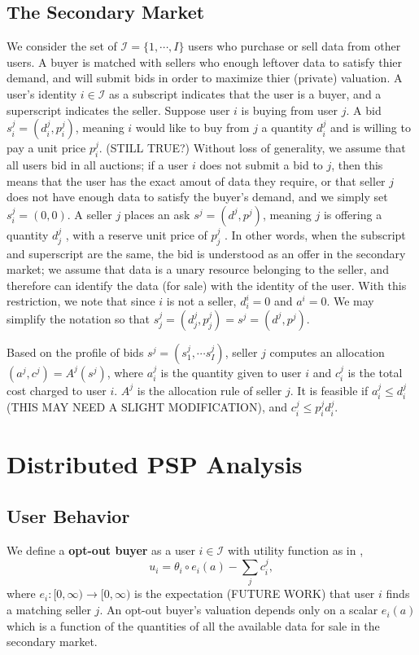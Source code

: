 \documentclass[12pt]{article}
\theoremstyle{definition}
\newcommand{\mcI}{\mathcal{I}}
\begin{document}
\begin{multicols}{2}
\subsection{The Secondary Market}

We consider the set of $\mcI = \lbrace 1, \cdots, I\rbrace$ users who purchase or sell
data from other users. A buyer is matched with sellers who enough leftover data
to satisfy thier demand, and will submit bids in order to maximize thier (private) valuation.
A user's identity $i \in \mcI$ as a subscript indicates that the user
is a buyer, and a superscript indicates the seller.
Suppose user $i$ is buying from user $j$. A bid $s_i^j = (d_i^j, p_i^j)$,
meaning $i$ would like to buy from $j$ a quantity $d^j_i$ and is willing to pay
a unit price $p^j_i$. (STILL TRUE?) Without loss of generality, we assume that all users bid in all
auctions; if a user $i$ does not submit a bid to $j$, then this means that
the user has the exact amout of data they require, or that seller $j$ does not have
enough data to satisfy the buyer's demand, and we simply set $s^j_i = (0, 0)$.
A seller $j$ places an ask $s^j = (d^j, p^j)$, meaning $j$ is offering a
quantity $d_j^j$ , with a reserve unit price of $p_j^j$ . In other words, when the subscript and
superscript are the same, the bid is understood as an offer in the secondary
market; we assume that data is a unary resource belonging to the seller, and
therefore can identify the data (for sale) with the identity of the user.
With this restriction, we note that since $i$ is not a seller, $d_i^i = 0$ and
$a^i = 0$. We may simplify the notation so that $s_j^j = (d_j^j, p_j^j) = s^j = (d^j, p^j)$.

Based on the profile of bids $s^j = (s^j_1, \cdots s^j_I)$, seller $j$ computes
an allocation $(a^j, c^j) = A^j(s^j)$, where $a^j_i$ is the quantity given to
user $i$ and $c^j_i$ is the total cost charged to user $i$. $A^j$ is the
allocation rule of seller $j$. It is feasible if $a^j_i \le d_i^j$ (THIS MAY
NEED A SLIGHT MODIFICATION), and $c^j_i \le  p^j_i d_i^j$.

\section{Distributed PSP Analysis}
\subsection{User Behavior}

We define a \textbf{opt-out buyer} as a user $i\in\mcI$ with utility
function as in \cite{semret},
\begin{equation}\label{opt-utility}
    u_i = \theta_i \circ e_i(a) - \displaystyle\sum_j c_i^j,
\end{equation}
where $e_i : [0, \infty) \rightarrow [0,\infty)$ is the expectation (FUTURE
WORK) that user
$i$ finds a matching seller $j$. An opt-out buyer's valuation
depends only on a scalar $e_i(a)$ which is a function of the
quantities of all the available data for sale in the secondary market. 


\end{multicols}
\end{document}
